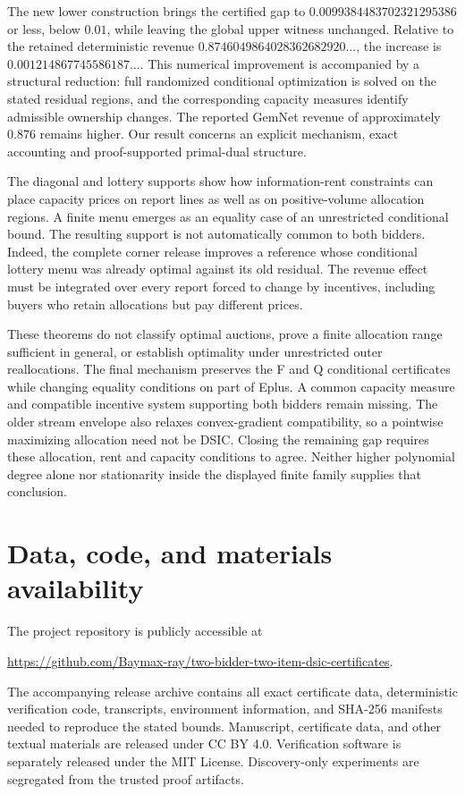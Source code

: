 \documentclass[11pt]{article}
\begin{document}
The new lower construction brings the certified gap to
$0.0099384483702321295386$ or less, below $0.01$, while leaving the global
upper witness unchanged. Relative to the retained deterministic revenue
$0.8746049864028362682920\ldots$, the increase is
$0.001214867745586187\ldots$. This numerical improvement is accompanied by
a structural reduction: full randomized conditional optimization is solved
on the stated residual regions, and the corresponding capacity measures
identify admissible ownership changes. The reported GemNet revenue of
approximately $0.876$ remains higher. Our result concerns an explicit
mechanism, exact accounting and proof-supported primal-dual structure.

The diagonal and lottery supports show how information-rent constraints
can place capacity prices on report lines as well as on positive-volume
allocation regions. A finite menu emerges as an equality case of an
unrestricted conditional bound. The resulting support is not automatically
common to both bidders. Indeed, the complete corner release improves a
reference whose conditional lottery menu was already optimal against its
old residual. The revenue effect must be integrated over every report
forced to change by incentives, including buyers who retain allocations
but pay different prices.

These theorems do not classify optimal auctions, prove a finite allocation
range sufficient in general, or establish optimality under unrestricted
outer reallocations. The final mechanism preserves the F and Q conditional
certificates while changing equality conditions on part of Eplus. A common
capacity measure and compatible incentive system supporting both bidders
remain missing. The older stream envelope also relaxes convex-gradient
compatibility, so a pointwise maximizing allocation need not be DSIC.
Closing the remaining gap requires these allocation, rent and capacity
conditions to agree. Neither higher polynomial degree alone nor stationarity
inside the displayed finite family supplies that conclusion.

\section*{Data, code, and materials availability}

The project repository is publicly accessible at
\begin{center}\small
\url{https://github.com/Baymax-ray/two-bidder-two-item-dsic-certificates}.
\end{center}
The accompanying release archive contains all exact certificate data, deterministic
verification code, transcripts, environment information, and SHA-256
manifests needed to reproduce the stated bounds.  Manuscript, certificate
data, and other textual materials are released under CC BY 4.0.  Verification
software is separately released under the MIT License.  Discovery-only
experiments are segregated from the trusted proof artifacts.
\end{document}
